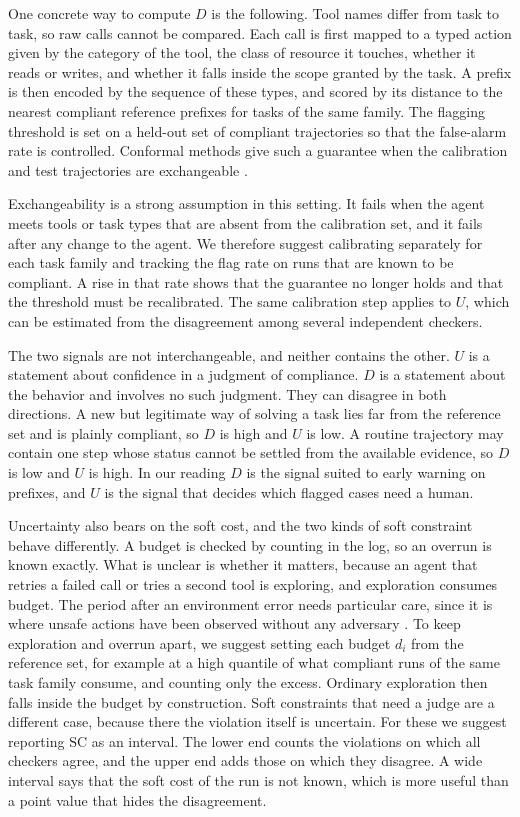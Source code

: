 \documentclass{article}
\begin{document}
One concrete way to compute $D$ is the following. Tool names differ from task to task, so raw calls cannot be compared. Each call is first mapped to a typed action given by the category of the tool, the class of resource it touches, whether it reads or writes, and whether it falls inside the scope granted by the task. A prefix is then encoded by the sequence of these types, and scored by its distance to the nearest compliant reference prefixes for tasks of the same family. The flagging threshold is set on a held-out set of compliant trajectories so that the false-alarm rate is controlled. Conformal methods give such a guarantee when the calibration and test trajectories are exchangeable \citep{vovk2005algorithmic}.

Exchangeability is a strong assumption in this setting. It fails when the agent meets tools or task types that are absent from the calibration set, and it fails after any change to the agent. We therefore suggest calibrating separately for each task family and tracking the flag rate on runs that are known to be compliant. A rise in that rate shows that the guarantee no longer holds and that the threshold must be recalibrated. The same calibration step applies to $U$, which can be estimated from the disagreement among several independent checkers.

The two signals are not interchangeable, and neither contains the other. $U$ is a statement about confidence in a judgment of compliance. $D$ is a statement about the behavior and involves no such judgment. They can disagree in both directions. A new but legitimate way of solving a task lies far from the reference set and is plainly compliant, so $D$ is high and $U$ is low. A routine trajectory may contain one step whose status cannot be settled from the available evidence, so $D$ is low and $U$ is high. In our reading $D$ is the signal suited to early warning on prefixes, and $U$ is the signal that decides which flagged cases need a human.

Uncertainty also bears on the soft cost, and the two kinds of soft constraint behave differently. A budget is checked by counting in the log, so an overrun is known exactly. What is unclear is whether it matters, because an agent that retries a failed call or tries a second tool is exploring, and exploration consumes budget. The period after an environment error needs particular care, since it is where unsafe actions have been observed without any adversary \citep{jha2026meltdowns}. To keep exploration and overrun apart, we suggest setting each budget $d_i$ from the reference set, for example at a high quantile of what compliant runs of the same task family consume, and counting only the excess. Ordinary exploration then falls inside the budget by construction. Soft constraints that need a judge are a different case, because there the violation itself is uncertain. For these we suggest reporting $\mathrm{SC}$ as an interval. The lower end counts the violations on which all checkers agree, and the upper end adds those on which they disagree. A wide interval says that the soft cost of the run is not known, which is more useful than a point value that hides the disagreement.
\end{document}
